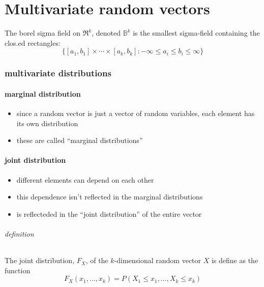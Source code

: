 
\part*{Multivariate random vectors}%

 The borel sigma field on $\Re^k$, denoted $\mathbb{B}^k$ is the
     smallest sigma-field containing the clos.ed
     rectangles: \[\{[a_1,b_1] \times \cdots \times [a_k,b_k] : -
     \infty \leq a_i \leq b_i \leq \infty\}\]

\section{multivariate distributions}
\subsection{marginal distribution}

\begin{itemize}
\item since a random vector is just a vector of random variables, each
       element has its own distribution
\item these are called ``marginal distributions''
\end{itemize}

\subsection{joint distribution}

\begin{itemize}
\item different elements can depend on each other
\item this dependence isn't reflected in the marginal distributions
\item is reflecteded in the ``joint distribution'' of the entire vector
\end{itemize}

\paragraph{definition}
      The joint distribution, $F_X$, of the $k$-dimensional random
      vector $X$ is define as the function 
      \[ F_X(x_1,\dots,x_k) = P(X_1 \leq x_1,\dots,X_k \leq x_k) \]

